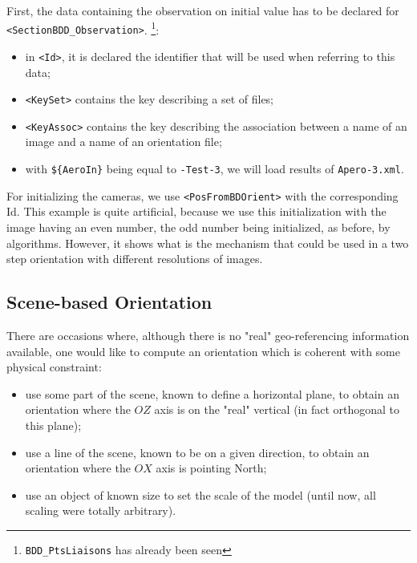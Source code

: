 First, the data containing the observation on initial value has
to be declared for  {\tt  <SectionBDD\_Observation>}.
\footnote { {\tt BDD\_PtsLiaisons} has already been seen}:

\begin{itemize}
   \item  in {\tt <Id>}, it is declared the identifier that will be used when
         referring to this data;
    \item {\tt <KeySet>} contains the key describing a set of files;
    \item {\tt <KeyAssoc>} contains the key describing  the association
         between a name of an image and a name of an orientation file;

     \item with {\tt \$\{AeroIn\}} being equal to {\tt -Test-3},
          we will load results of {\tt Apero-3.xml}.
\end{itemize}

For initializing the cameras, we use {\tt <PosFromBDOrient>} with
the corresponding Id. This example is quite  artificial, because
we use this initialization with the image having an even number, the
odd number being initialized, as before, by  algorithms. However,
it shows what is the mechanism that could be used in a two step orientation
with different resolutions of images.


\subsection{Scene-based Orientation}

\label{SC:Base:Or}

There are occasions where, although there is no "real" geo-referencing
information available, one would like to compute an orientation which is coherent with
some physical constraint:


\begin{itemize}

   \item  use some part of the scene, known to define a horizontal plane, to
          obtain an orientation where the $OZ$ axis is on the "real" vertical (in
          fact orthogonal to this plane);

   \item  use a line of the scene, known to be on a given direction,  to
          obtain an orientation where the $OX$ axis is pointing North;

   \item  use an object of known size to set the scale of the model
          (until now, all scaling were totally arbitrary).
\end{itemize}

